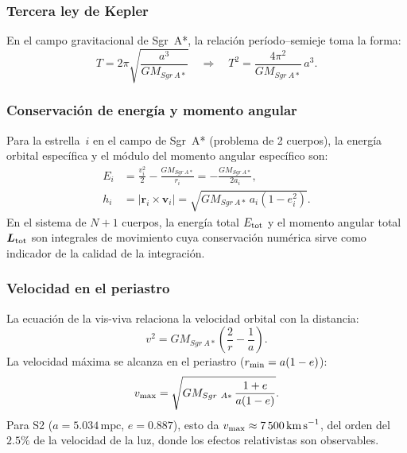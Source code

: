 \documentclass[12pt,a4paper]{article}
\newcommand{\SgrA}{Sgr~A*}
\newcommand{\mpc}{\text{mpc}}
\newcommand{\vmax}{v_{\rm max}}
\begin{document}
\subsubsection{Tercera ley de Kepler}
\label{subsubsec:kepler3}

En el campo gravitacional de \SgrA{}, la relación período--semieje toma la forma:
\begin{equation}
  T = 2\pi \sqrt{\frac{a^3}{G M_{\SgrA}}}
  \quad\Longrightarrow\quad
  T^2 = \frac{4\pi^2}{G M_{\SgrA}}\,a^3.
  \label{eq:kepler3}
\end{equation}

\subsubsection{Conservación de energía y momento angular}
\label{subsubsec:conservacion}

Para la estrella~$i$ en el campo de \SgrA{} (problema de 2 cuerpos), la energía
orbital específica y el módulo del momento angular específico son:
\begin{align}
  E_i &= \frac{v_i^2}{2} - \frac{G M_{\SgrA}}{r_i}
       = -\frac{G M_{\SgrA}}{2a_i},
  \label{eq:energia} \\
  h_i &= |\bm{r}_i \times \bm{v}_i|
       = \sqrt{G M_{\SgrA}\,a_i(1-e_i^2)}.
  \label{eq:momento}
\end{align}
En el sistema de $N+1$ cuerpos, la energía total $E_{\rm tot}$ y el momento angular
total $\bm{L}_{\rm tot}$ son integrales de movimiento cuya conservación numérica
sirve como indicador de la calidad de la integración.

\subsubsection{Velocidad en el periastro}
\label{subsubsec:visva}

La ecuación de la vis-viva relaciona la velocidad orbital con la distancia:
\begin{equation}
  v^2 = G M_{\SgrA}\left(\frac{2}{r} - \frac{1}{a}\right).
  \label{eq:visviva}
\end{equation}
La velocidad máxima se alcanza en el periastro ($r_{\rm min} = a(1-e)$):
\begin{equation}
  \vmax = \sqrt{G M_{\SgrA}\,\frac{1+e}{a(1-e)}}.
  \label{eq:vmax}
\end{equation}
Para S2 ($a = 5.034\,\mpc$, $e = 0.887$), esto da
$\vmax \approx 7\,500\,\text{km\,s}^{-1}$, del orden del $2.5\%$ de la velocidad de
la luz, donde los efectos relativistas son observables.
\end{document}
